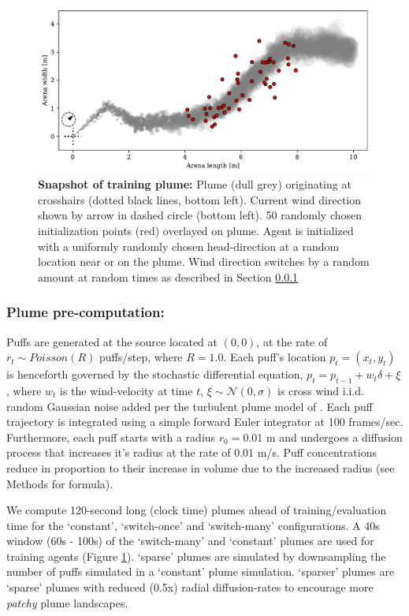 \documentclass[5p,twocolumn,authoryear]{elsarticle}
\begin{document}
\begin{figure}[h!]
\centering
\includegraphics[width=0.85\linewidth]{fig_training_plume.pdf}
\caption{\textbf{Snapshot of training plume:} 
Plume (dull grey) originating at crosshairs (dotted black lines, bottom left).
Current wind direction shown by arrow in dashed circle (bottom left).
50 randomly chosen initialization points (red) overlayed on plume.
Agent is initialized with a uniformly randomly chosen head-direction at a random location near or on the plume. 
Wind direction switches by a random amount at random times as described in Section \ref{supp_plumegen}
}
\label{training_plume}
\end{figure}



\noindent \subsubsection{Plume pre-computation:}
\label{supp_plumegen}
Puffs are generated at the source located at $(0,0)$, at the rate of $r_t \sim Poisson(R)$ puffs/step, where $R=1.0$.
Each puff's location $p_t = (x_t,y_t)$ is henceforth governed by the stochastic differential equation, $p_t = p_{t-1} + w_t \delta + \xi$, where $w_t$ is the wind-velocity at time $t$,   $\xi \sim \mathcal{N}(0, \sigma)$ is cross wind i.i.d. random Gaussian noise added per the turbulent plume model of \citep{farrell2002filament}. 
Each puff trajectory is integrated using a simple forward Euler integrator at 100 frames/sec.
Furthermore, each puff starts with a radius $r_0 = 0.01$ m and undergoes a diffusion process that increases it's radius at the rate of $0.01$ m/s.
Puff concentrations reduce in proportion to their increase in volume due to the increased radius (see Methods for formula). 

We compute 120-second long (clock time) plumes ahead of training/evaluation time for the `constant',  `switch-once' and `switch-many' configurations.
A 40s window (60s - 100s) of the `switch-many' and `constant' plumes are used for training agents (Figure \ref{training_plume}).
`sparse' plumes are simulated by downsampling the number of puffs simulated in a `constant' plume simulation.
`sparser' plumes are `sparse' plumes with reduced (0.5x) radial diffusion-rates to encourage more \textit{patchy} plume landscapes.
\end{document}
